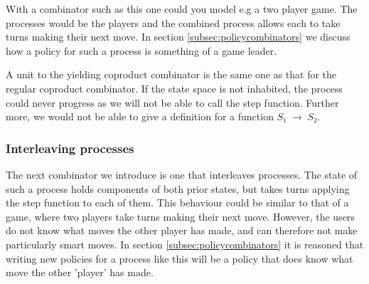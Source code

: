 \documentclass[sigplan,review]{acmart}\settopmatter{printfolios=true,printccs=false,printacmref=false}
\newcommand{\Conid}[1]{\mathit{#1}}
\begin{document}
%
With a combinator such as this one could you model e.g a two player game.
%
The processes would be the players and the combined process allows each to take turns making their next move.
%
In section \ref{subsec:policycombinators} we discuss how a policy for such a process is something of a game leader.
%

%
A unit to the yielding coproduct combinator is the same one as that for the regular coproduct combinator.
%
If the state space is not inhabited, the process could never progress as we will not be able to call the step function.
%
Further more, we would not be able to give a definition for a function \ensuremath{\Conid{S₁}\;\to \;\Conid{S₂}}.
%

\subsubsection{Interleaving processes}
\label{subsubsec:interleavingseqdecproc}
%
The next combinator we introduce is one that interleaves processes.
%
The state of such a process holds components of both prior states, but takes turns applying the step function to each of them.
%
This behaviour could be similar to that of a game, where two players take turns making their next move.
%
However, the users do not know what moves the other player has made, and can therefore not make particularly smart moves.
%
In section \ref{subsec:policycombinators} it is reasoned that writing new policies for a process like this will be a policy that does know what move the other 'player' has made.
%
\end{document}
